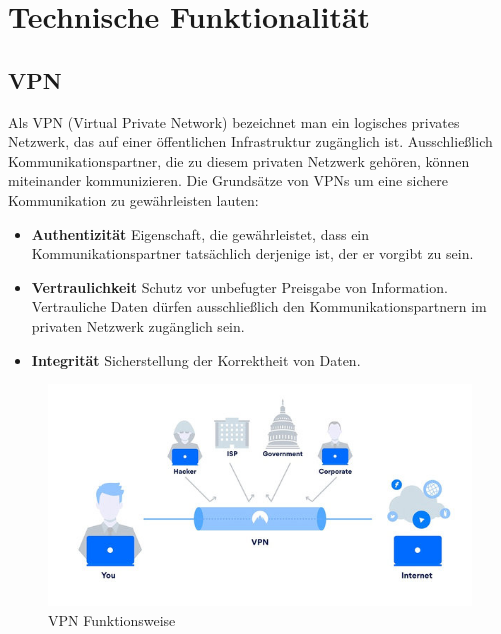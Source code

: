 \section{Technische Funktionalität} %
\subsection{VPN}
Als VPN (Virtual Private Network) bezeichnet man ein logisches privates Netzwerk, das auf einer öffentlichen Infrastruktur zugänglich ist. Ausschließlich Kommunikationspartner, die zu diesem privaten Netzwerk gehören, können miteinander kommunizieren.\newline
Die Grundsätze von VPNs um eine sichere Kommunikation zu gewährleisten lauten:
\begin{itemize}
    \item \textbf{Authentizität} \newline
    Eigenschaft, die gewährleistet, dass ein Kommunikationspartner tatsächlich derjenige ist, der er vorgibt zu sein.
    \item \textbf{Vertraulichkeit} \newline
    Schutz vor unbefugter Preisgabe von Information. Vertrauliche Daten dürfen ausschließlich den Kommunikationspartnern im privaten Netzwerk zugänglich sein.
    \item \textbf{Integrität} \newline
    Sicherstellung der Korrektheit von Daten.
\end{itemize}
\begin{figure}[H]
  \centering
  \includegraphics[scale=0.85]{images/vpn.jpg}
  \caption{VPN Funktionsweise}
\end{figure}
